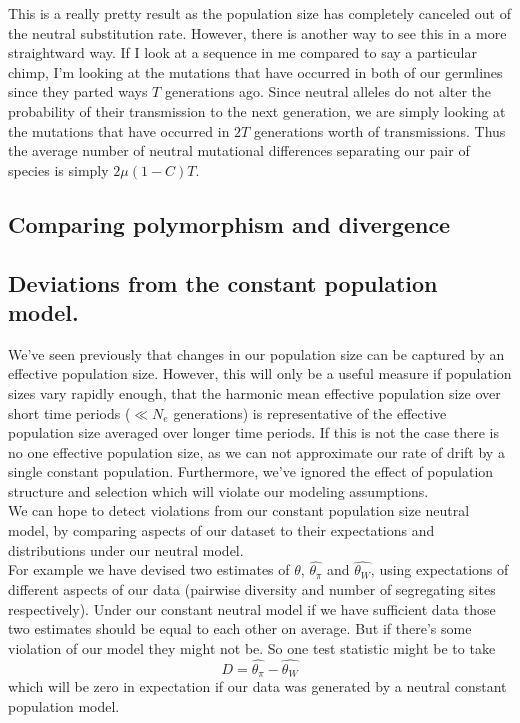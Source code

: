 This is a really pretty result as the population size has completely
canceled out of the neutral substitution rate. However, there is
another way to see this in a more straightward way. If I look at a
sequence in me compared to say a particular chimp, I'm looking at the mutations
that have occurred in both of our germlines since they parted ways $T$
generations ago. Since neutral alleles do not alter the probability
of their transmission to the next generation, we are simply looking at
the mutations that have occurred in $2T$ generations worth of
transmissions. Thus the average number of neutral mutational
differences separating our pair of species is simply $2\mu (1-C) T$.\\




\subsection{Comparing polymorphism and divergence}


\subsection{Deviations from the constant population model.}
We've seen previously that changes in our population size can be
captured by an effective population size. However, this will only be a
useful measure if population sizes vary rapidly enough, that the
harmonic mean effective population size over short time periods ($\ll
N_e$ generations) is representative of the effective population size averaged over
longer time periods. If this is not the case there is no one effective
population size, as we can not approximate our rate of drift by a
single constant population. Furthermore, we've ignored the effect of
population structure and selection which will violate our modeling
assumptions. \\

We can hope to detect violations from our constant population size
neutral model, by comparing aspects of our dataset to their expectations
and distributions under our neutral model. \\

For example we have devised two estimates of $\theta$,
$\widehat{\theta_{\pi}}$ and $\widehat{\theta_{W}}$, using
expectations of different aspects of our data (pairwise diversity and
number of segregating sites respectively). Under our constant neutral
model if we have sufficient data those two estimates should be
equal to each other on average. But if there's some violation of our model they might not
be. So one test statistic might be to take
\begin{equation}
D = \widehat{\theta_{\pi}} - \widehat{\theta_{W}}
\end{equation}
which will be zero in expectation if our data was generated by a
neutral constant population model.




\newpage
